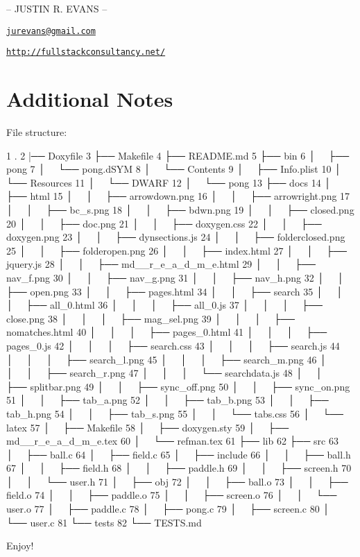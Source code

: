 -- J\+U\+S\+T\+I\+N R. E\+V\+A\+N\+S --

\href{mailto:jurevans@gmail.com}{\tt jurevans@gmail.\+com}

\href{http://fullstackconsultancy.net/}{\tt http\+://fullstackconsultancy.\+net/}

\section*{Additional Notes }

File structure\+:


\begin{DoxyCode}
1 .
2 |── Doxyfile
3 ├── Makefile
4 ├── README.md
5 ├── bin
6 │   ├── pong
7 │   └── pong.dSYM
8 │       └── Contents
9 │           ├── Info.plist
10 │           └── Resources
11 │               └── DWARF
12 │                   └── pong
13 ├── docs
14 │   ├── html
15 │   │   ├── arrowdown.png
16 │   │   ├── arrowright.png
17 │   │   ├── bc\_s.png
18 │   │   ├── bdwn.png
19 │   │   ├── closed.png
20 │   │   ├── doc.png
21 │   │   ├── doxygen.css
22 │   │   ├── doxygen.png
23 │   │   ├── dynsections.js
24 │   │   ├── folderclosed.png
25 │   │   ├── folderopen.png
26 │   │   ├── index.html
27 │   │   ├── jquery.js
28 │   │   ├── md\_\_r\_e\_a\_d\_m\_e.html
29 │   │   ├── nav\_f.png
30 │   │   ├── nav\_g.png
31 │   │   ├── nav\_h.png
32 │   │   ├── open.png
33 │   │   ├── pages.html
34 │   │   ├── search
35 │   │   │   ├── all\_0.html
36 │   │   │   ├── all\_0.js
37 │   │   │   ├── close.png
38 │   │   │   ├── mag\_sel.png
39 │   │   │   ├── nomatches.html
40 │   │   │   ├── pages\_0.html
41 │   │   │   ├── pages\_0.js
42 │   │   │   ├── search.css
43 │   │   │   ├── search.js
44 │   │   │   ├── search\_l.png
45 │   │   │   ├── search\_m.png
46 │   │   │   ├── search\_r.png
47 │   │   │   └── searchdata.js
48 │   │   ├── splitbar.png
49 │   │   ├── sync\_off.png
50 │   │   ├── sync\_on.png
51 │   │   ├── tab\_a.png
52 │   │   ├── tab\_b.png
53 │   │   ├── tab\_h.png
54 │   │   ├── tab\_s.png
55 │   │   └── tabs.css
56 │   └── latex
57 │       ├── Makefile
58 │       ├── doxygen.sty
59 │       ├── md\_\_r\_e\_a\_d\_m\_e.tex
60 │       └── refman.tex
61 ├── lib
62 ├── src
63 │   ├── ball.c
64 │   ├── field.c
65 │   ├── include
66 │   │   ├── ball.h
67 │   │   ├── field.h
68 │   │   ├── paddle.h
69 │   │   ├── screen.h
70 │   │   └── user.h
71 │   ├── obj
72 │   │   ├── ball.o
73 │   │   ├── field.o
74 │   │   ├── paddle.o
75 │   │   ├── screen.o
76 │   │   └── user.o
77 │   ├── paddle.c
78 │   ├── pong.c
79 │   ├── screen.c
80 │   └── user.c
81 └── tests
82     └── TESTS.md
\end{DoxyCode}


Enjoy! 